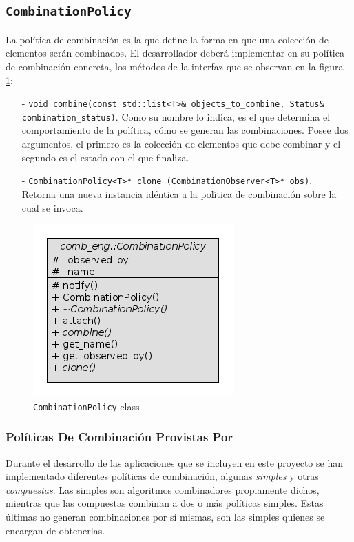 		\subsection{\texttt{CombinationPolicy}}
			La pol\'itica de combinaci\'on es la que define la forma en que una colecci\'on de elementos ser\'an combinados. El desarrollador deber\'a implementar 
			en su pol\'itica de combinaci\'on concreta, los m\'etodos de la interfaz que se observan en la figura \ref{combPolicyClass}:
			\begin{itemize}
				\item[-] \footnotesize{\texttt{void combine(const std::list<T>\&  objects\_to\_combine, Status\& combination\_status)}}. \normalsize{}Como su nombre 
				  lo indica, es el que determina el comportamiento de la pol\'itica, c\'omo se generan las combinaciones. Posee dos argumentos, el primero es la 
				  colecci\'on de elementos que debe combinar y el segundo es el estado con el que finaliza.
				\item[-] \footnotesize{\texttt{CombinationPolicy<T>* clone (CombinationObserver<T>* obs)}}.\\ 
				  \normalsize Retorna una nueva instancia id\'entica a la pol\'itica de combinaci\'on sobre la cual se invoca.
	
			\end{itemize}
			\begin{figure}[ht] \hspace{3.6cm}
    	  \includegraphics[scale=.56]{images/combination_policy_class.png}
		    \caption{\texttt{CombinationPolicy} class}
		    \label{combPolicyClass}
      \end{figure}
      \subsubsection{Pol\'iticas De Combinaci\'on Provistas Por \combeng}
      	Durante el desarrollo de las aplicaciones que se incluyen en este proyecto se han implementado 
      	diferentes pol\'iticas de combinaci\'on, algunas \textit{simples} y otras \textit{compuestas}. Las simples son algoritmos combinadores propiamente 
      	dichos, mientras que las compuestas combinan a dos o m\'as pol\'iticas simples. Estas \'ultimas no generan combinaciones por s\'i mismas, son las 
      	simples quienes se encargan de obtenerlas.
        		
